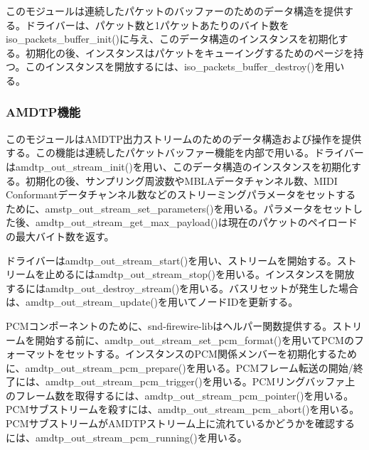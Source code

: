 \documentclass[onecolumn]{jarticle}
\begin{document}
このモジュールは連続したパケットのバッファーのためのデータ構造を提供する。ドライバーは、パケット数と1パケットあたりのバイト数をiso\_packets\_buffer\_init()に与え、このデータ構造のインスタンスを初期化する。初期化の後、インスタンスはパケットをキューイングするためのページを持つ。このインスタンスを開放するには、iso\_packets\_buffer\_destroy()を用いる。

\subsubsection{AMDTP機能}
\label{sec:packetization-out}

このモジュールはAMDTP出力ストリームのためのデータ構造および操作を提供する。この機能は連続したパケットバッファー機能を内部で用いる。ドライバーはamdtp\_out\_stream\_init()を用い、このデータ構造のインスタンスを初期化する。初期化の後、サンプリング周波数やMBLAデータチャンネル数、MIDI Conformantデータチャンネル数などのストリーミングパラメータをセットするために、amstp\_out\_stream\_set\_parameters()を用いる。パラメータをセットした後、amdtp\_out\_stream\_get\_max\_payload()は現在のパケットのペイロードの最大バイト数を返す。

ドライバーはamdtp\_out\_stream\_start()を用い、ストリームを開始する。ストリームを止めるにはamdtp\_out\_stream\_stop()を用いる。インスタンスを開放するにはamdtp\_out\_destroy\_stream()を用いる。バスリセットが発生した場合は、amdtp\_out\_stream\_update()を用いてノードIDを更新する。

PCMコンポーネントのために、snd-firewire-libはヘルパー関数提供する。ストリームを開始する前に、amdtp\_out\_stream\_set\_pcm\_format()を用いてPCMのフォーマットをセットする。インスタンスのPCM関係メンバーを初期化するために、amdtp\_out\_stream\_pcm\_prepare()を用いる。PCMフレーム転送の開始/終了には、amdtp\_out\_stream\_pcm\_trigger()を用いる。PCMリングバッファ上のフレーム数を取得するには、amdtp\_out\_stream\_pcm\_pointer()を用いる。PCMサブストリームを殺すには、amdtp\_out\_stream\_pcm\_abort()を用いる。PCMサブストリームがAMDTPストリーム上に流れているかどうかを確認するには、amdtp\_out\_stream\_pcm\_running()を用いる。
\end{document}
